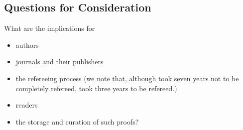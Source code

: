 \subsection{Questions for Consideration}
What are the implications for
\begin{itemize}
\item authors
\item journals and their publishers
\item the refereeing process (we note that, although \cite{Hales2005} took seven years not to be completely refereed,  \cite{Halesetal2017a} took three years to be refereed.) %
\item readers
\item the storage and curation of such proofs?%
\end{itemize}

